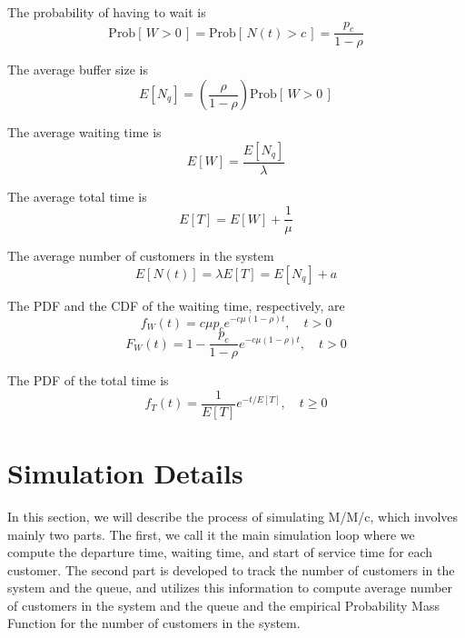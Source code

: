 \documentclass[12pt, a4paper]{article}
\begin{document}
The probability of having to wait is 
\begin{equation}
  \text{Prob}[\, W > 0 \,] = \text{Prob}[\, N(t) > c \,]
  = \frac{p_c}{1 - \rho}
\end{equation}

The average buffer size is 
\begin{equation}
  E[N_q] = \left( \frac{\rho}{1 - \rho} \right) \text{Prob}
  [\, W > 0 \,]
\end{equation}

The average waiting time is 
\begin{equation}
  E[W] =\frac{E[N_q]}{\lambda}
\end{equation}

The average total time is 
\begin{equation}
  E[T] = E[W] + \frac{1}{\mu}
\end{equation}

The average number of customers in the system 
\begin{equation}
  E[N(t)] = \lambda E[T] = E[N_q] + a  
\end{equation}

The PDF and the CDF of the waiting time, respectively, are 
\begin{equation}
  f_W(t) = c \mu p_c e^{-c \mu \left( 1 - \rho \right)t}, \quad t > 0
\end{equation}
\begin{equation}
  F_W(t) = 1 - \frac{p_c}{1 - \rho} e^{-c \mu \left( 1 - \rho \right)t}, \quad t > 0
\end{equation}

The PDF of the total time is 
\begin{equation}
  f_T(t) = \frac{1}{E[T]} e^{- t/ E[T] }, \quad t \ge 0 
\end{equation}

\newpage
\section{Simulation Details}
In this section, we will describe the process of simulating M/M/c,
which involves mainly two parts. The first, we call it the main
simulation loop where we compute the departure time, waiting time, 
and start of service time for each customer. The second part is developed 
to track the number of customers in the system and the queue, and utilizes this 
information to compute average number of customers in the system and the queue 
and the empirical Probability Mass Function for the number of customers in the 
system.
\end{document}
